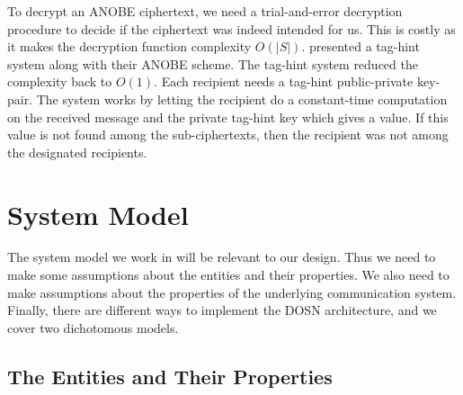 %
%

To decrypt an \ac{ANOBE} ciphertext, we need a trial-and-error decryption 
procedure to decide if the ciphertext was indeed intended for us.
This is costly as it makes the decryption function complexity \(O(|S|)\).
\citet{ANOBE} presented a tag-hint system along with their \ac{ANOBE} scheme.
The tag-hint system reduced the complexity back to \(O(1)\).
Each recipient needs a tag-hint public-private key-pair.
The system works by letting the recipient do a constant-time computation on the 
received message and the private tag-hint key which gives a value.
If this value is not found among the sub-ciphertexts, then the recipient was 
not among the designated recipients.


\section{System Model}\label{sec:SystemModel}

The system model we work in will be relevant to our design.
Thus we need to make some assumptions about the entities and their 
properties.
We also need to make assumptions about the properties of the underlying 
communication system.
Finally, there are different ways to implement the \ac{DOSN} architecture, and 
we cover two dichotomous models.

\subsection{The Entities and Their Properties}\label{sec:EntitiesProperties}

